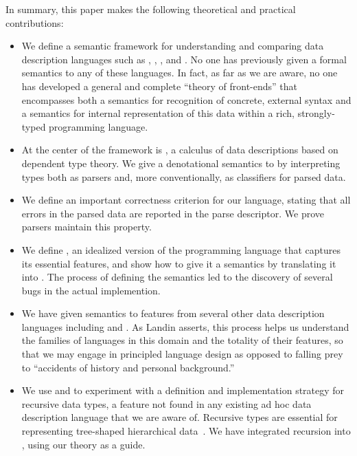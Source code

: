 In summary, this paper makes the following theoretical and practical
contributions:
%
\begin{itemize}
\item We define a semantic framework for understanding and comparing data description languages such as \pads{},
\packettypes{}, \datascript{}, and \blt{}.
No one has previously given a formal semantics to any of these 
languages.  In fact, as far as we are aware, no one has developed 
a general and complete ``theory of front-ends'' 
that encompasses 
both a semantics for recognition of concrete, external syntax and 
a semantics for internal representation of this data within a
rich, strongly-typed programming language.

\item At the center of the framework is \ddc{},
a calculus of data descriptions based on dependent type theory.
We give a denotational semantics
to \ddc{} by interpreting
types both as parsers and, more conventionally, 
as classifiers for parsed data. 

\item We define an important correctness criterion for our language,
stating that all errors in the parsed data are reported in the parse 
descriptor.  We prove \ddc{} parsers maintain this property.

\item We define \ipads{}, an idealized
version of the \pads{} programming language
that captures its essential features,
and show how to give it a semantics by translating it into \ddc{}.  
The process of defining the semantics led to the
discovery of several bugs in the actual implemention.

\item We have given semantics to features from several other data description
languages including \packettypes{} and \datascript{}.  As Landin asserts, 
this process helps us understand the families of languages in this domain
and the totality of their features, so that we may engage in principled
language design
as opposed to falling prey to ``accidents of history and personal background.''

\item We use \ipads{} and \ddc{} to experiment with 
a definition and implementation strategy for recursive data types,
a feature not found in any existing ad hoc data description language that
we are aware of.  Recursive types are essential for representing 
tree-shaped hierarchical
data~\cite{geneontology,newick}.  
We have integrated recursion into \pads{},
using our theory as a guide. 
\end{itemize}

